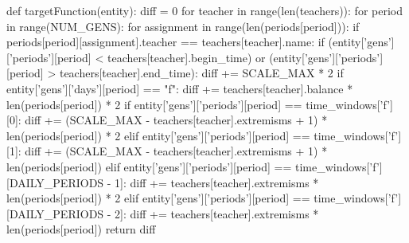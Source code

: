\documentclass[12pt,a4paper]{report}
\begin{document}
\begin{python}
def targetFunction(entity):
    diff = 0
    for teacher in range(len(teachers)):
        for period in range(NUM_GENS):
            for assignment in range(len(periods[period])):
                if periods[period][assignment].teacher == teachers[teacher].name:
                    if (entity['gens']['periods'][period] < teachers[teacher].begin_time) or (entity['gens']['periods'][period] > teachers[teacher].end_time):
                        diff += SCALE_MAX * 2
                    if entity['gens']['days'][period] == "f":
                        diff += teachers[teacher].balance * len(periods[period]) * 2
                    if entity['gens']['periods'][period] == time_windows['f'][0]:
                        diff += (SCALE_MAX - teachers[teacher].extremisms + 1) * len(periods[period]) * 2
                    elif entity['gens']['periods'][period] == time_windows['f'][1]:
                        diff += (SCALE_MAX - teachers[teacher].extremisms + 1) * len(periods[period])
                    elif entity['gens']['periods'][period] == time_windows['f'][DAILY_PERIODS - 1]:
                        diff += teachers[teacher].extremisms * len(periods[period]) * 2
                    elif entity['gens']['periods'][period] == time_windows['f'][DAILY_PERIODS - 2]:
                        diff += teachers[teacher].extremisms * len(periods[period])
    return diff
\end{python}
\end{document}
